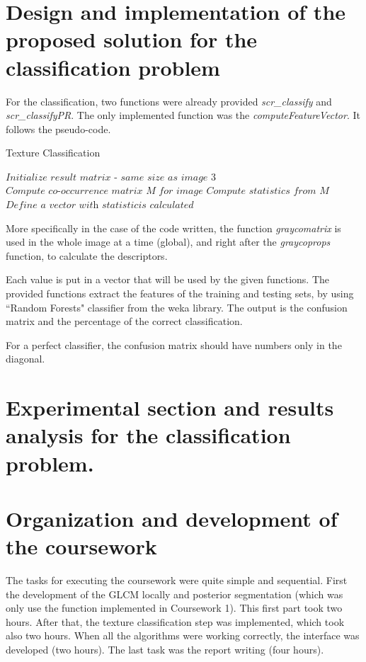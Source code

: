 \documentclass{article}
\begin{document}
\section{Design and implementation of the proposed solution for the classification problem}

For the classification, two functions were already provided \textit{scr\_classify} and \textit{scr\_classifyPR}. The only implemented function was the \textit{computeFeatureVector}. It follows the pseudo-code.

\begin{algorithm}
\caption{Texture Classification}
\begin{algorithmic} 
\STATE $\textit{Initialize result matrix - same size as image 3}$
\STATE $\textit{Compute co-occurrence matrix M for image}$
\STATE $\textit{Compute statistics from M}$
\STATE $\textit{Define a vector with statisticis calculated}$
\end{algorithmic}
\end{algorithm}

More specifically in the case of the code written, the function \textit{graycomatrix} is used in the whole image at a time (global), and right after the \textit{graycoprops} function, to calculate the descriptors.

Each value is put in a vector that will be used by the given functions. The provided functions extract the features of the training and testing sets, by using ``Random Forests" classifier from the weka library. The output is the confusion matrix and the percentage of the correct classification.

For a perfect classifier, the confusion matrix should have numbers only in the diagonal.

\section{Experimental section and results analysis for the classification problem.}


\section{Organization and development of the coursework}

The tasks for executing the coursework were quite simple and sequential. First the development of the GLCM locally and posterior segmentation (which was only use the function implemented in Coursework 1). This first part took two hours. After that, the texture classification step was implemented, which took also two hours. When all the algorithms were working correctly, the interface was developed (two hours). The last task was the report writing (four hours).
\end{document}

